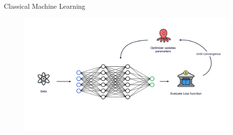 \documentclass[8pt, xcolor={svgnames}, hyperref={linkcolor=amethyst}]{beamer}
\begin{document}
\begin{frame}{Classical Machine Learning}
\begin{figure}
   \includegraphics[width=1\linewidth]{figures/ml_scheme.png}
\end{figure}  
\end{frame}
\end{document}
